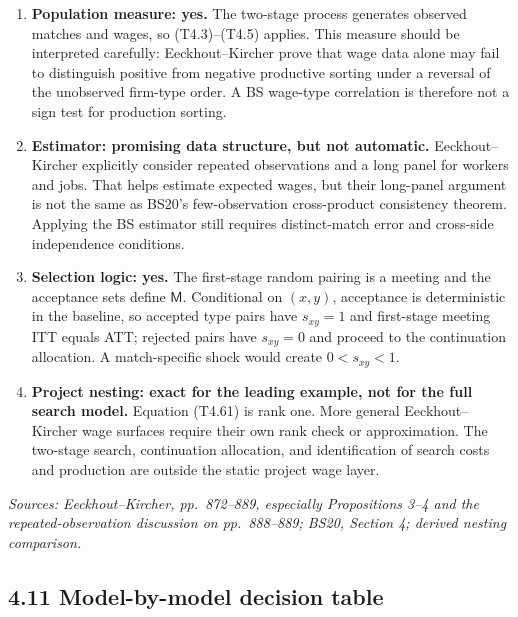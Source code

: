 \documentclass[11pt]{article}
\begin{document}
\begin{enumerate}
\item \textbf{Population measure: yes.}  The two-stage process generates
  observed matches and wages, so (T4.3)--(T4.5) applies.  This measure should
  be interpreted carefully: Eeckhout--Kircher prove that wage data alone may
  fail to distinguish positive from negative productive sorting under a
  reversal of the unobserved firm-type order.  A BS wage-type correlation is
  therefore not a sign test for production sorting.
\item \textbf{Estimator: promising data structure, but not automatic.}
  Eeckhout--Kircher explicitly consider repeated observations and a long
  panel for workers and jobs.  That helps estimate expected wages, but their
  long-panel argument is not the same as BS20's few-observation
  cross-product consistency theorem.  Applying the BS estimator still
  requires distinct-match error and cross-side independence conditions.
\item \textbf{Selection logic: yes.}  The first-stage random pairing is a
  meeting and the acceptance sets define \(\mathsf M\).  Conditional on
  \((x,y)\), acceptance is deterministic in the baseline, so accepted type
  pairs have \(s_{xy}=1\) and first-stage meeting ITT equals ATT; rejected
  pairs have \(s_{xy}=0\) and proceed to the continuation allocation.  A
  match-specific shock would create \(0<s_{xy}<1\).
\item \textbf{Project nesting: exact for the leading example, not for the
  full search model.}  Equation (T4.61) is rank one.  More general
  Eeckhout--Kircher wage surfaces require their own rank check or
  approximation.  The two-stage search, continuation allocation, and
  identification of search costs and production are outside the static
  project wage layer.
\end{enumerate}

\textit{Sources: Eeckhout--Kircher, pp.\ 872--889, especially Propositions
3--4 and the repeated-observation discussion on pp.\ 888--889; BS20,
Section 4; derived nesting comparison.}

\subsection{4.11 Model-by-model decision table}
\end{document}
